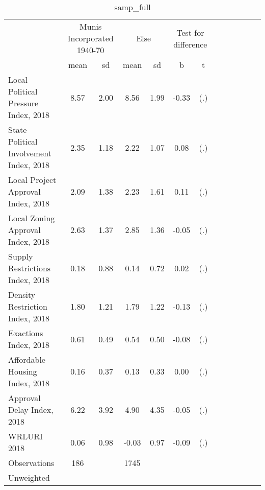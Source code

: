 \begin{table}[htbp]\centering
\def\sym#1{\ifmmode^{#1}\else\(^{#1}\)\fi}
\caption{samp\_full \label{tab1}}
\begin{tabular}{l*{3}{cccc}}
\toprule
                    &\multicolumn{2}{c}{Munis Incorporated 1940-70}&\multicolumn{2}{c}{Else} &\multicolumn{2}{c}{Test for difference}\\
                    &        mean&          sd&        mean&          sd&           b         &           t\\
\midrule
Local Political Pressure Index, 2018&        8.57&        2.00&        8.56&        1.99&       -0.33         &         (.)\\
State Political Involvement Index, 2018&        2.35&        1.18&        2.22&        1.07&        0.08         &         (.)\\
Local Project Approval Index, 2018&        2.09&        1.38&        2.23&        1.61&        0.11         &         (.)\\
Local Zoning Approval Index, 2018&        2.63&        1.37&        2.85&        1.36&       -0.05         &         (.)\\
Supply Restrictions Index, 2018&        0.18&        0.88&        0.14&        0.72&        0.02         &         (.)\\
Density Restriction Index, 2018&        1.80&        1.21&        1.79&        1.22&       -0.13         &         (.)\\
Exactions Index, 2018&        0.61&        0.49&        0.54&        0.50&       -0.08         &         (.)\\
Affordable Housing Index, 2018&        0.16&        0.37&        0.13&        0.33&        0.00         &         (.)\\
Approval Delay Index, 2018&        6.22&        3.92&        4.90&        4.35&       -0.05         &         (.)\\
WRLURI 2018         &        0.06&        0.98&       -0.03&        0.97&       -0.09         &         (.)\\
\midrule
Observations        &         186&            &        1745&            &                     &            \\
\bottomrule
\multicolumn{7}{l}{\footnotesize Unweighted}\\
\end{tabular}
\end{table}
